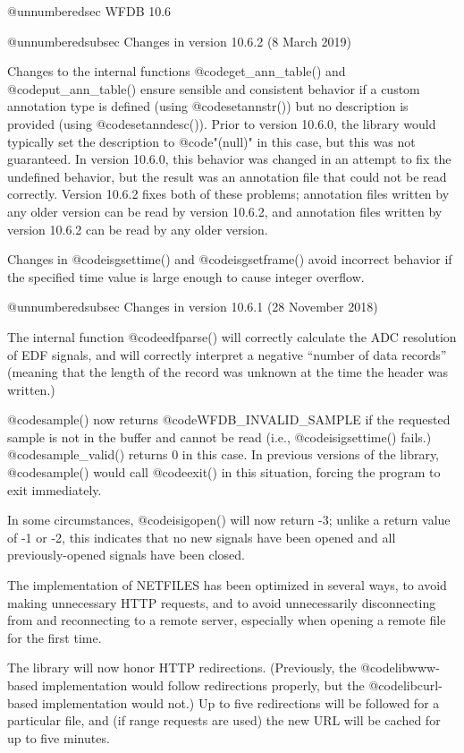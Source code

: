 {{{{{{{{@unnumberedsec WFDB 10.6

@unnumberedsubsec Changes in version 10.6.2 (8 March 2019)

Changes to the internal functions @code{get_ann_table()} and
@code{put_ann_table()} ensure sensible and consistent behavior if a custom
annotation type is defined (using @code{setannstr()}) but no description is
provided (using @code{setanndesc()}).  Prior to version 10.6.0, the library
would typically set the description to @code{"(null)"} in this case, but this
was not guaranteed.  In version 10.6.0, this behavior was changed in an attempt
to fix the undefined behavior, but the result was an annotation file that could
not be read correctly.  Version 10.6.2 fixes both of these problems; annotation
files written by any older version can be read by version 10.6.2, and
annotation files written by version 10.6.2 can be read by any older version.

Changes in @code{isgsettime()} and @code{isgsetframe()} avoid incorrect
behavior if the specified time value is large enough to cause integer overflow.

@unnumberedsubsec Changes in version 10.6.1 (28 November 2018)

The internal function @code{edfparse()} will correctly calculate the ADC
resolution of EDF signals, and will correctly interpret a negative ``number of
data records'' (meaning that the length of the record was unknown at the time
the header was written.)

@code{sample()} now returns @code{WFDB_INVALID_SAMPLE} if the requested sample
is not in the buffer and cannot be read (i.e., @code{isigsettime()} fails.)
@code{sample_valid()} returns 0 in this case.  In previous versions of the
library, @code{sample()} would call @code{exit()} in this situation, forcing
the program to exit immediately.

In some circumstances, @code{isigopen()} will now return -3; unlike a return
value of -1 or -2, this indicates that no new signals have been opened and all
previously-opened signals have been closed.

The implementation of NETFILES has been optimized in several ways, to avoid
making unnecessary HTTP requests, and to avoid unnecessarily disconnecting from
and reconnecting to a remote server, especially when opening a remote file for
the first time.

The library will now honor HTTP redirections.  (Previously, the
@code{libwww}-based implementation would follow redirections properly, but the
@code{libcurl}-based implementation would not.)  Up to five redirections will
be followed for a particular file, and (if range requests are used) the new URL
will be cached for up to five minutes.

}}}}}}}}
